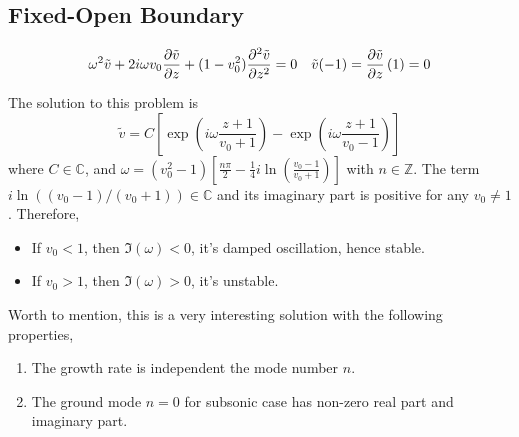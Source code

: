 \subsection{Fixed-Open Boundary}

\begin{equation} \label{eq:constant-v-problem-fixed-open}
    \omega^2\tilde{v} + 2i\omega v_0\pdv{\tilde{v}}{z} + (1-v_0^2)\pdv[2]{\tilde{v}}{z} = 0
    \quad
    \tilde{v}(-1) = \pdv{\tilde{v}}{z}\,(1) = 0
\end{equation}

The solution to this problem is
\begin{equation} \label{eq:constant-v-solution-fixed-open}
    \tilde{v} = C \left[\exp\left(i\omega\frac{z+1}{v_0+1}\right)
        - \exp\left(i\omega\frac{z+1}{v_0-1}\right) \right]
\end{equation}
where $C\in\mathbb{C}$, and $\omega = (v_0^2 - 1) \left[\frac{n\pi}{2} - \frac{1}{4}i\ln(\frac{v_0-1}{v_0+1})\right]$ with $n\in\mathbb{Z}$. The term $i\ln((v_0-1)/(v_0+1))\in\mathbb{C}$ and its imaginary part is positive for any $v_0\neq 1$. Therefore,
\begin{itemize}
    \item If $v_0<1$, then $\Im(\omega)<0$, it's damped oscillation, hence stable.
    \item If $v_0>1$, then $\Im(\omega)>0$, it's unstable.
\end{itemize}

Worth to mention, this is a very interesting solution with the following properties,
\begin{enumerate}
    \item The growth rate is independent the mode number $n$.
    \item The ground mode $n=0$ for subsonic case has non-zero real part and imaginary part.
\end{enumerate}

